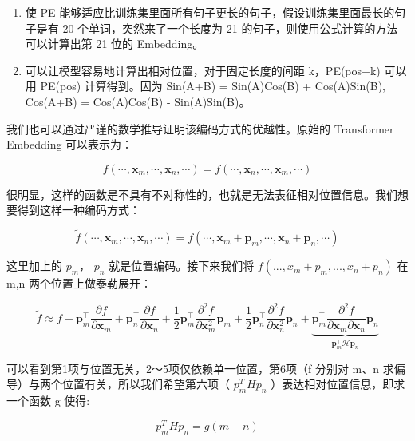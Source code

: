 \documentclass[
]{article}
\providecommand{\tightlist}{%
  \setlength{\itemsep}{0pt}\setlength{\parskip}{0pt}}
\begin{document}
\begin{enumerate}
\def\labelenumi{\arabic{enumi}.}
\tightlist
\item
  使 PE
  能够适应比训练集里面所有句子更长的句子，假设训练集里面最长的句子是有
  20 个单词，突然来了一个长度为 21
  的句子，则使用公式计算的方法可以计算出第 21 位的 Embedding。
\item
  可以让模型容易地计算出相对位置，对于固定长度的间距 k，PE(pos+k) 可以用
  PE(pos) 计算得到。因为 Sin(A+B) = Sin(A)Cos(B) + Cos(A)Sin(B),
  Cos(A+B) = Cos(A)Cos(B) - Sin(A)Sin(B)。
\end{enumerate}

我们也可以通过严谨的数学推导证明该编码方式的优越性。原始的 Transformer
Embedding 可以表示为：

\[
\begin{equation}f(\cdots,\boldsymbol{x}_m,\cdots,\boldsymbol{x}_n,\cdots)=f(\cdots,\boldsymbol{x}_n,\cdots,\boldsymbol{x}_m,\cdots)\end{equation}
\]

很明显，这样的函数是不具有不对称性的，也就是无法表征相对位置信息。我们想要得到这样一种编码方式：

\[
\begin{equation}\tilde{f}(\cdots,\boldsymbol{x}_m,\cdots,\boldsymbol{x}_n,\cdots)=f(\cdots,\boldsymbol{x}_m + \boldsymbol{p}_m,\cdots,\boldsymbol{x}_n + \boldsymbol{p}_n,\cdots)\end{equation}
\]

这里加上的 \(p_m\)， \(p_n\) 就是位置编码。接下来我们将
\(f(...,x_m+p_m,...,x_n+p_n)\) 在 m,n 两个位置上做泰勒展开：

\[
\begin{equation}\tilde{f}\approx f + \boldsymbol{p}_m^{\top} \frac{\partial f}{\partial \boldsymbol{x}_m} + \boldsymbol{p}_n^{\top} \frac{\partial f}{\partial \boldsymbol{x}_n} + \frac{1}{2}\boldsymbol{p}_m^{\top} \frac{\partial^2 f}{\partial \boldsymbol{x}_m^2}\boldsymbol{p}_m + \frac{1}{2}\boldsymbol{p}_n^{\top} \frac{\partial^2 f}{\partial \boldsymbol{x}_n^2}\boldsymbol{p}_n + \underbrace{\boldsymbol{p}_m^{\top} \frac{\partial^2 f}{\partial \boldsymbol{x}_m \partial \boldsymbol{x}_n}\boldsymbol{p}_n}_{\boldsymbol{p}_m^{\top} \boldsymbol{\mathcal{H}} \boldsymbol{p}_n}\end{equation}
\]

可以看到第1项与位置无关，2～5项仅依赖单一位置，第6项（f 分别对 m、n
求偏导）与两个位置有关，所以我们希望第六项（ \(p_m^THp_n\)
）表达相对位置信息，即求一个函数 g 使得:

\[
p_m^THp_n = g(m-n)
\]
\end{document}

